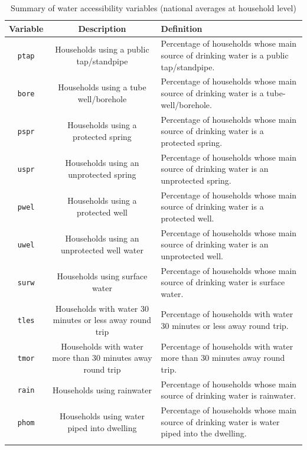 \documentclass[10pt,twoside]{article}
\numberwithin{equation}{section}
\newcommand{\?}{\stackrel{?}{=}}
\begin{document}
\begin{table}[h!]
  \centering
  \begin{tabular}{c c m{5cm}}\toprule
    \bf Variable & \bf Description & \bf Definition \\\midrule
    \texttt{ptap} & Households using a public tap/standpipe
 & Percentage of households whose main source of drinking water is a public tap/standpipe.
 \\\hline
 \texttt{bore} & Households using a tube well/borehole & Percentage of households whose main source of drinking water is a tube-well/borehole.
\\\hline
\texttt{pspr} & Households using a protected spring
& Percentage of households whose main source of drinking water is a protected spring.
\\\hline
\texttt{uspr} & Households using an unprotected spring
& Percentage of households whose main source of drinking water is an unprotected spring.
\\\hline
\texttt{pwel} & Households using a protected well
& Percentage of households whose main source of drinking water is a protected well.
\\\hline
\texttt{uwel} & Households using an unprotected well water
&Percentage of households whose main source of drinking water is an unprotected well.
\\\hline
\texttt{surw} & Households using surface water
& Percentage of households whose main source of drinking water is surface water.
\\\hline
\texttt{tles} & Households with water 30 minutes or less away round trip
&Percentage of households with water 30 minutes or less away round trip.
\\\hline 
\texttt{tmor} & Households with water more than 30 minutes away round trip & Percentage of households with water more than 30 minutes away round trip.
\\\hline
\texttt{rain} & Households using rainwater
& Percentage of households whose main source of drinking water is rainwater.
\\\hline
\texttt{phom} & Households using water piped into dwelling
&Percentage of households whose main source of drinking water is water piped into the dwelling.
\\\hline

& \\\bottomrule
  \end{tabular}
  \caption{Summary of water accessibility variables (national averages at household level)}
  \label{tab:summary}
\end{table}
\end{document}
